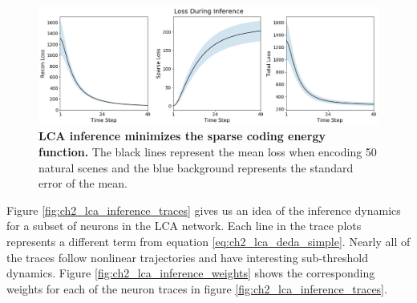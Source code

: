 \begin{figure}[h]
    \centering
    \includegraphics[width=\textwidth]{figures/lca_inference_loss.png}
    \caption{\textbf{LCA inference minimizes the sparse coding energy function.} The black lines represent the mean loss when encoding 50 natural scenes and the blue background represents the standard error of the mean.}
    \label{fig:ch2_lca_inference_loss}
\end{figure}

Figure \ref{fig:ch2_lca_inference_traces} gives us an idea of the inference dynamics for a subset of neurons in the LCA network. Each line in the trace plots represents a different term from equation \eqref{eq:ch2_lca_deda_simple}. Nearly all of the traces follow nonlinear trajectories and have interesting sub-threshold dynamics. Figure \ref{fig:ch2_lca_inference_weights} shows the corresponding weights for each of the neuron traces in figure \ref{fig:ch2_lca_inference_traces}.

